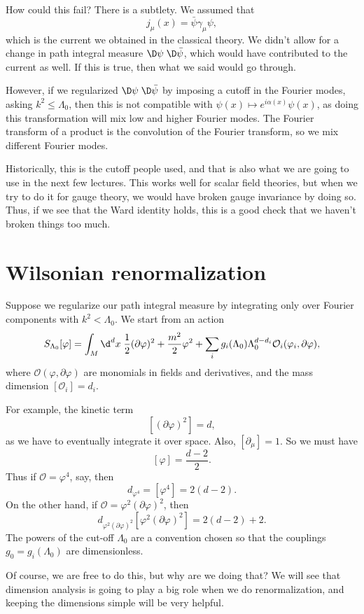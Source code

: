 \documentclass[a4paper]{article}
\begin{document}
How could this fail? There is a subtlety. We assumed that
\[
  j_\mu(x) = \bar\psi \gamma_\mu \psi,
\]
which is the current we obtained in the classical theory. We didn't allow for a change in path integral measure $\D \psi\;\D \bar\psi$, which would have contributed to the current as well. If this is true, then what we said would go through.

However, if we regularized $\D \psi\; \D \bar\psi$ by imposing a cutoff in the Fourier modes, asking $k^2 \leq \Lambda_0$, then this is not compatible with $\psi(x) \mapsto e^{i\alpha(x)} \psi(x)$, as doing this transformation will mix low and higher Fourier modes. The Fourier transform of a product is the convolution of the Fourier transform, so we mix different Fourier modes.

Historically, this is the cutoff people used, and that is also what we are going to use in the next few lectures. This works well for scalar field theories, but when we try to do it for gauge theory, we would have broken gauge invariance by doing so. Thus, if we see that the Ward identity holds, this is a good check that we haven't broken things too much.

\section{Wilsonian renormalization}
Suppose we regularize our path integral measure by integrating only over Fourier components with $k^2 < \Lambda_0$. We start from an action
\[
  S_{\Lambda_0} [\varphi] = \int_M \d^d x\; \frac{1}{2}(\partial \varphi)^2 + \frac{m^2}{2} \varphi^2 + \sum_i g_i(\Lambda_0) \Lambda^{d - d_i}_0 \mathcal{O}_i(\varphi_i , \partial\varphi),
\]
where $\mathcal{O}(\varphi, \partial \varphi)$ are monomials in fields and derivatives, and the mass dimension $[\mathcal{O}_i] = d_i$.

For example, the kinetic term 
\[
  [(\partial \varphi)^2] = d,
\]
as we have to eventually integrate it over space. Also, $[\partial_\mu] = 1$. So we must have
\[
  [\varphi] = \frac{d - 2}{2}.
\]
Thus if $\mathcal{O} = \varphi^4$, say, then
\[
  d_{\varphi^4} =  [\varphi^4] = 2 (d - 2).
\]
On the other hand, if $\mathcal{O} = \varphi^2 (\partial\varphi)^2$, then
\[
  d_{\varphi^2 (\partial \varphi)^2} [\varphi^2 (\partial \varphi)^2] = 2 (d - 2) + 2.
\]
The powers of the cut-off $\Lambda_0$ are a convention chosen so that the couplings $g_0 = g_i(\Lambda_0)$ are dimensionless.

Of course, we are free to do this, but why are we doing that? We will see that dimension analysis is going to play a big role when we do renormalization, and keeping the dimensions simple will be very helpful.
\end{document}
